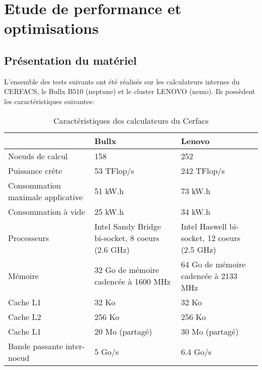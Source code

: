 \section{Etude de performance et optimisations}\label{sec:part3}
\subsection{Présentation du matériel}
L'ensemble des tests suivants ont été réalisés sur les calculateurs internes du CERFACS, le Bullx B510 (neptune) et le cluster LENOVO (nemo). Ils possèdent les caractéristiques suivantes:

\begin{table}[h]
  \begin{center}
    \begin{tabular}{|M{3.5cm}|M{5cm}|M{5cm}|}
      \hline
      & Bullx & Lenovo \\
      \hline
      Noeuds de calcul & 158 & 252 \\
      \hline
      Puissance crête & 53 TFlop/s & 242 TFlop/s \\
      \hline
      Consommation maximale applicative & 51 kW.h & 73 kW.h \\
      \hline
      Consommation à vide & 25 kW.h & 34 kW.h \\
      \hline
      Processeurs & Intel Sandy Bridge bi-socket, 8 coeurs (2.6 GHz) & Intel Haswell bi-socket, 12 coeurs (2.5 GHz) \\
      \hline
      Mémoire & 32 Go de mémoire cadencée à 1600 MHz & 64 Go de mémoire cadencée à 2133 MHz \\
      \hline
      Cache L1 & 32 Ko & 32 Ko \\
      \hline
      Cache L2 & 256 Ko & 256 Ko \\
      \hline
      Cache L1 & 20 Mo (partagé) & 30 Mo (partagé) \\
      \hline
      Bande passante inter-noeud & 5 Go/s & 6.4 Go/s \\
      \hline
    \end{tabular}
  \end{center}
  \caption{\label{tab:carac}Caractéristiques des calculateurs du Cerfacs}
\end{table}

